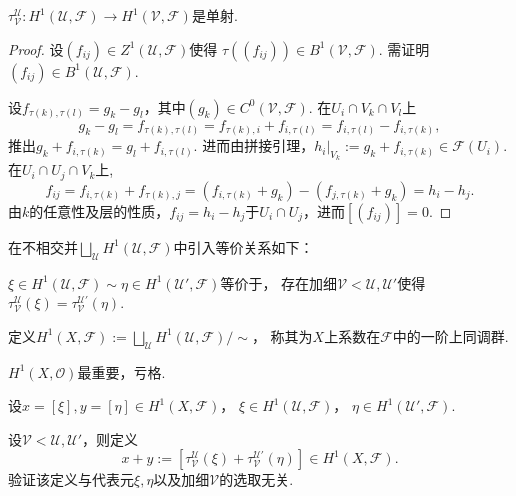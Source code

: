 \begin{lemma}
	$\tau^{\mathscr{U}}_{\mathscr{V}}\colon H^1(\mathscr{U}, \mathscr{F})
    \rightarrow H^1(\mathscr{V},\mathscr{F})$是单射.
\end{lemma}
		
\begin{proof}
	设$(f_{ij})\in Z^1(\mathscr{U}, \mathscr{F})$使得
    $\tau((f_{ij}))\in B^1(\mathscr{V},\mathscr{F})$. 
    需证明$(f_{ij})\in B^1(\mathscr{U},\mathscr{F})$.

	设$f_{\tau(k),\tau(l)}=g_k-g_l$，其中$(g_k)\in C^0(\mathscr{V},\mathscr{F})$. 
    在$U_i\cap V_k\cap V_l$上
	$$g_k-g_l=f_{\tau(k),\tau(l)}=f_{\tau(k),i}+f_{i,\tau(l)}
    =f_{i,\tau(l)}-f_{i,\tau(k)},$$
	推出$g_k+f_{i,\tau(k)}=g_l+f_{i,\tau(l)}$. 
    进而由拼接引理，$h_i|_{V_k}:=g_k+f_{i,\tau(k)}\in \mathscr{F}(U_i)$.
	在$U_i\cap U_j\cap V_k$上,
	$$f_{ij}=f_{i,\tau(k)}+f_{\tau(k),j}=(f_{i,\tau(k)}+g_k)-(f_{j,\tau(k)}+g_k)=h_i-h_j.$$
	由$k$的任意性及层的性质，$f_{ij}=h_i-h_j$于$U_i \cap U_j$，进而$[(f_{ij})]=0$.
\end{proof}
		
\begin{definition}
    在不相交并$\bigsqcup\limits_{\mathscr{U}}H^1(\mathscr{U},\mathscr{F})$中引入等价关系如下：

	$\xi \in H^1(\mathscr{U},\mathscr{F})\sim \eta\in H^1(\mathscr{U}',\mathscr{F})$等价于，
    存在加细$\mathscr{V}<\mathscr{U}, \mathscr{U}'$使得
    $\tau^\mathscr{U}_\mathscr{V}(\xi)=\tau^{\mathscr{U}'}_\mathscr{V}(\eta)$.

	定义$H^1(X,\mathscr{F}):=\bigsqcup\limits_{\mathscr{U}} H^1(\mathscr{U}, \mathscr{F})/\sim$，
    称其为$X$上系数在$\mathscr{F}$中的一阶上同调群.
\end{definition}
		
\begin{remark}
    $H^1(X,\mathcal{O})$最重要，亏格.
\end{remark}
		
\begin{definition}
	设$x=[\xi], y=[\eta]\in H^1(X, \mathscr{F})$，
    $\xi\in H^1(\mathscr{U}, \mathscr{F})$，
    $\eta\in H^1(\mathscr{U}',\mathscr{F})$.

	设$\mathscr{V}< \mathscr{U}, \mathscr{U}'$，则定义
	$$x+y:=[\tau^\mathscr{U}_\mathscr{V}(\xi)+\tau^{\mathscr{U}'}_\mathscr{V}(\eta)]\in H^1(X, \mathscr{F}).$$
	验证该定义与代表元$\xi, \eta$以及加细$\mathscr{V}$的选取无关.
\end{definition}
		

